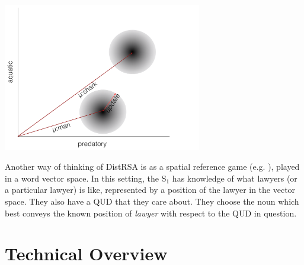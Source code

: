 \documentclass[10pt,letterpaper,twocolumn]{article}
\begin{document}


\includegraphics[height=6.5cm]{diagram1.pdf}
   







Another way of thinking of DistRSA is as a spatial reference game (e.g. \cite{golland2010game}), played in a word vector space. In this setting, the S$_1$ has knowledge of what lawyers (or a particular lawyer) is like, represented by a position of the lawyer in the vector space. They also have a QUD that they care about. They choose the noun which best conveys the known position of \emph{lawyer} with respect to the QUD in question.









\section{Technical Overview} \label{technicaloverview}
\end{document}
